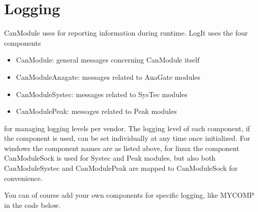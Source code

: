 \documentclass[letterpaper,10pt,english]{sphinxmanual}
\begin{document}
\chapter{Logging}
\label{\detokenize{logging:logging}}\label{\detokenize{logging::doc}}
CanModule uses  for reporting information during runtime. LogIt uses the four components
\begin{itemize}
\item {} 
CanModule: general messages concerning CanModule itself

\item {} 
CanModuleAnagate: messages related to AnaGate modules

\item {} 
CanModuleSystec: messages related to SysTec modules

\item {} 
CanModulePeak: messages related to Peak modules

\end{itemize}

for managing logging levels per vendor. The logging level of each component, if the component is used, can be set individually
at any time once initialized. For windows the component names are as listed above, for linux the component CanModuleSock is used
for Systec and Peak modules, but also both CanModuleSystec and CanModulePeak are mapped to CanModuleSock for convenience.

You can of course add your own components for specific logging, like MYCOMP in the code below.

\end{document}
